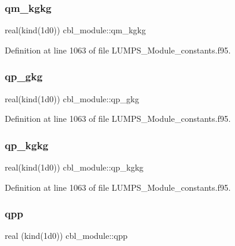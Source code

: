 \subsubsection{\texorpdfstring{qm\+\_\+kgkg}{qm\_kgkg}}
{\footnotesize\ttfamily real(kind(1d0)) cbl\+\_\+module\+::qm\+\_\+kgkg}



Definition at line 1063 of file L\+U\+M\+P\+S\+\_\+\+Module\+\_\+constants.\+f95.

\mbox{\label{namespacecbl__module_a45208115b84dad98c55d11cf93307c0c}} 
\subsubsection{\texorpdfstring{qp\+\_\+gkg}{qp\_gkg}}
{\footnotesize\ttfamily real(kind(1d0)) cbl\+\_\+module\+::qp\+\_\+gkg}



Definition at line 1063 of file L\+U\+M\+P\+S\+\_\+\+Module\+\_\+constants.\+f95.

\mbox{\label{namespacecbl__module_a19585b12b6f9726bfbda1954703b7b4d}} 
\subsubsection{\texorpdfstring{qp\+\_\+kgkg}{qp\_kgkg}}
{\footnotesize\ttfamily real(kind(1d0)) cbl\+\_\+module\+::qp\+\_\+kgkg}



Definition at line 1063 of file L\+U\+M\+P\+S\+\_\+\+Module\+\_\+constants.\+f95.

\mbox{\label{namespacecbl__module_a532658820cffbe2b75b727fb9e55d779}} 
\subsubsection{\texorpdfstring{qpp}{qpp}}
{\footnotesize\ttfamily real (kind(1d0)) cbl\+\_\+module\+::qpp}



